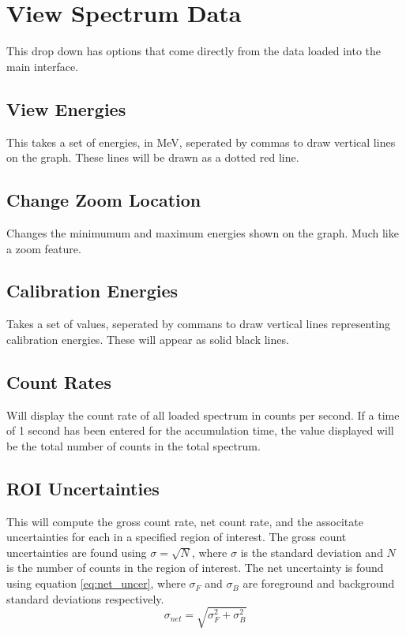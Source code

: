 \section{View Spectrum Data}
	This drop down has options that come directly from the data loaded into the main interface. 

		\subsection{View Energies}
			This takes a set of energies, in MeV, seperated by commas to draw vertical lines on the graph. These lines will be drawn as a dotted red line.
		\subsection{Change Zoom Location}
			Changes the minimumum and maximum energies shown on the graph. Much like a zoom feature. 
		\subsection{Calibration Energies}
			Takes a set of values, seperated by commans to draw vertical lines representing calibration energies. These will appear as solid black lines. 
		\subsection{Count Rates}
			Will display the count rate of all loaded spectrum in counts per second. If a time of 1 second has been entered for the accumulation time, the value displayed will be the total number of counts in the total spectrum.
		\subsection{ROI Uncertainties}
		This will compute the gross count rate, net count rate, and the associtate uncertainties for each in a specified region of interest. The gross count uncertainties are found using $\sigma=\sqrt{N}$, where $\sigma$ is the standard deviation and $N$ is the number of counts in the region of interest. The net uncertainty is found using equation \ref{eq:net_uncer}, where $\sigma_F$ and $\sigma_B$ are foreground and background standard deviations respectively.
		\begin{equation}
			\sigma_{net}=\sqrt{\sigma_F^2+\sigma_B^2}
			\label{eq:net_uncer}
		\end{equation}